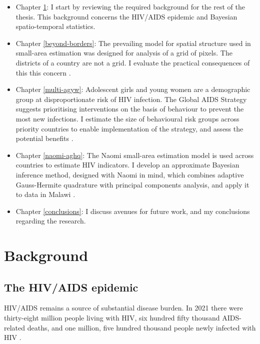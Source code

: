 \documentclass[a4paper, nobind]{templates/ociamthesis}
\providecommand{\tightlist}{%
  \setlength{\itemsep}{0pt}\setlength{\parskip}{0pt}}
\begin{document}
\begin{itemize}
\tightlist
\item
  Chapter \ref{background}: I start by reviewing the required background for the rest of the thesis. This background concerns the HIV/AIDS epidemic and Bayesian spatio-temporal statistics.
\item
  Chapter \ref{beyond-borders}: The prevailing model for spatial structure used in small-area estimation \autocite{besag1991bayesian} was designed for analysis of a grid of pixels. The districts of a country are not a grid. I evaluate the practical consequences of this this concern \autocite{howes2023beyond}.
\item
  Chapter \ref{multi-agyw}: Adolescent girls and young women are a demographic group at disproportionate risk of HIV infection. The Global AIDS Strategy suggests prioritising interventions on the basis of behaviour to prevent the most new infections. I estimate the size of behavioural risk groups across priority countries to enable implementation of the strategy, and assess the potential benefits \autocite{howes2023spatio}.
\item
  Chapter \ref{naomi-aghq}: The Naomi small-area estimation model \autocite{eaton2021naomi} is used across countries to estimate HIV indicators. I develop an approximate Bayesian inference method, designed with Naomi in mind, which combines adaptive Gauss-Hermite quadrature with principal components analysis, and apply it to data in Malawi \autocite{howes2023fast}.
\item
  Chapter \ref{conclusions}: I discuss avenues for future work, and my conclusions regarding the research.
\end{itemize}

\hypertarget{background}{%
\chapter{Background}\label{background}}

\adjustmtc
{}

\hypertarget{the-hivaids-epidemic}{%
\section{The HIV/AIDS epidemic}\label{the-hivaids-epidemic}}

HIV/AIDS remains a source of substantial disease burden.
In 2021 there were thirty-eight million people living with HIV, six hundred fifty thousand AIDS-related deaths, and one million, five hundred thousand people newly infected with HIV \autocite{unaids2021global}.
\end{document}

